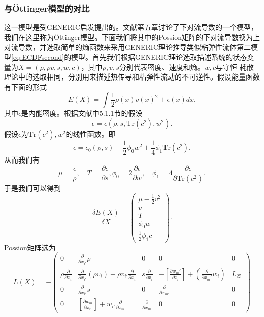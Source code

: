 	\subsubsection{与\"Ottinger模型的对比}
	这一模型是受GENERIC启发提出的。文献\cite{ottinger2005beyond}第五章讨论了下对流导数的一个模型，我们在这里称为\"Ottinger模型。下面我们将其中的Possion矩阵的下对流导数换为上对流导数，并选取简单的熵函数来采用GENERIC理论推导类似粘弹性流体第二模型\eqref{eq:ECDFsecond}的模型。首先我们根据GENERIC理论选取描述系统的状态变量为$X=(\rho,\rho v, s ,w ,c)$，其中$\rho,v,s$分别代表密度、速度和熵。$w,c$与守恒-耗散理论中的选取相同，分别用来描述热传导和粘弹性流动的不可逆性。假设能量函数有下面的形式
	\begin{equation*}
		E(X) =	\int \frac{1}{2} \rho(x) v(x)^2 + \epsilon(x) dx.
	\end{equation*}
	其中$\epsilon$是内能密度。根据文献\cite{ottinger2005beyond}中5.1.1节的假设
	\begin{equation*}
		\epsilon = \epsilon (\rho,s,\mbox{Tr}(c^2),w^2) .
	\end{equation*}
	假设$\epsilon$为$\mbox{Tr}(c^2),w^2$的线性函数。即
	\begin{equation*}
		\epsilon = \epsilon_0(\rho,s) + \frac{1}{2} \phi_0 w^2  + \frac{1}{4} \phi_1 \mbox{Tr}(c^2) .
	\end{equation*}
	从而我们有
	\begin{equation*}
		\mu = \frac{\epsilon}{\rho},\quad T = \frac{\partial \epsilon}{\partial s}, \phi_0 = 2 \frac{\partial \epsilon}{\partial w}, \quad \phi_1 = 4 \frac{\partial \epsilon}{\partial \mbox{Tr}(c^2)}.
	\end{equation*}
	于是我们可以得到
	\begin{equation*}
		\frac{\delta E(X)}{ \delta X} = \left( \begin{array}{c} \mu - \frac{1}{2} v^2 \\ v \\ T \\ \phi_0 w \\ \frac{1}{2} \phi_1 c \end{array} \right).
	\end{equation*}
	Possion矩阵选为
	\begin{equation*}
		L(X) = -\left( \begin{array}{ccccc}
		0 & \frac{\partial}{\partial {x_{i'}}} \rho & 0 & 0 & 0 \\
		\rho \frac{\partial}{\partial {x_i}} & \frac{\partial}{\partial {x_{i'}}} ({\rho v_i}) + \rho v_{i'} \frac{\partial}{\partial {x_i}} & s \frac{\partial}{\partial {x_i}} & -[\frac{\partial w_m'}{\partial x_i}] + (\frac{\partial}{\partial {x_m'}} w_i) & L_{25} \\
		0 &　\frac{\partial}{\partial x_{i'}} s & 0 & \frac{\partial }{\partial x_{m'}} & 0 \\
		0 & [\frac{\partial w_m}{\partial x_{i'}}] + w_{i'} \frac{\partial}{\partial x_{m}} & \frac{\partial}{\partial {x_m}} & 0 & 0 　
		\end{array}\right)
	\end{equation*}
